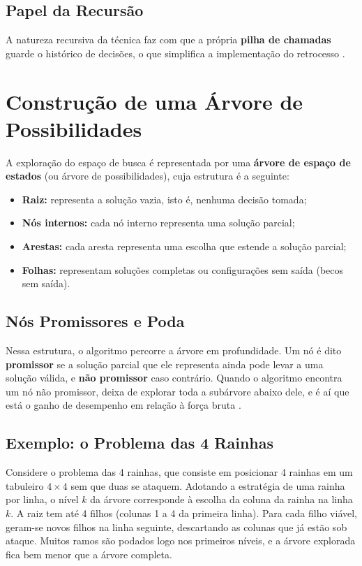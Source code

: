 \subsection{Papel da Recursão}

A natureza recursiva da técnica faz com que a própria \textbf{pilha de chamadas} guarde o histórico de decisões, o que simplifica a implementação do retrocesso \cite{ziviani2007, feofiloff2009}.

\section{Construção de uma Árvore de Possibilidades}

A exploração do espaço de busca é representada por uma \textbf{árvore de espaço de estados} (ou árvore de possibilidades), cuja estrutura é a seguinte:

\begin{itemize}
    \item \textbf{Raiz:} representa a solução vazia, isto é, nenhuma decisão tomada;
    \item \textbf{Nós internos:} cada nó interno representa uma solução parcial;
    \item \textbf{Arestas:} cada aresta representa uma escolha que estende a solução parcial;
    \item \textbf{Folhas:} representam soluções completas ou configurações sem saída (becos sem saída).
\end{itemize}

\subsection{Nós Promissores e Poda}

Nessa estrutura, o algoritmo percorre a árvore em profundidade. Um nó é dito \textbf{promissor} se a solução parcial que ele representa ainda pode levar a uma solução válida, e \textbf{não promissor} caso contrário. Quando o algoritmo encontra um nó não promissor, deixa de explorar toda a subárvore abaixo dele, e é aí que está o ganho de desempenho em relação à força bruta \cite{levitin2011, dasgupta2009}.

\subsection{Exemplo: o Problema das 4 Rainhas}

Considere o problema das 4 rainhas, que consiste em posicionar 4 rainhas em um tabuleiro $4 \times 4$ sem que duas se ataquem. Adotando a estratégia de uma rainha por linha, o nível $k$ da árvore corresponde à escolha da coluna da rainha na linha $k$. A raiz tem até 4 filhos (colunas 1 a 4 da primeira linha). Para cada filho viável, geram-se novos filhos na linha seguinte, descartando as colunas que já estão sob ataque. Muitos ramos são podados logo nos primeiros níveis, e a árvore explorada fica bem menor que a árvore completa.

